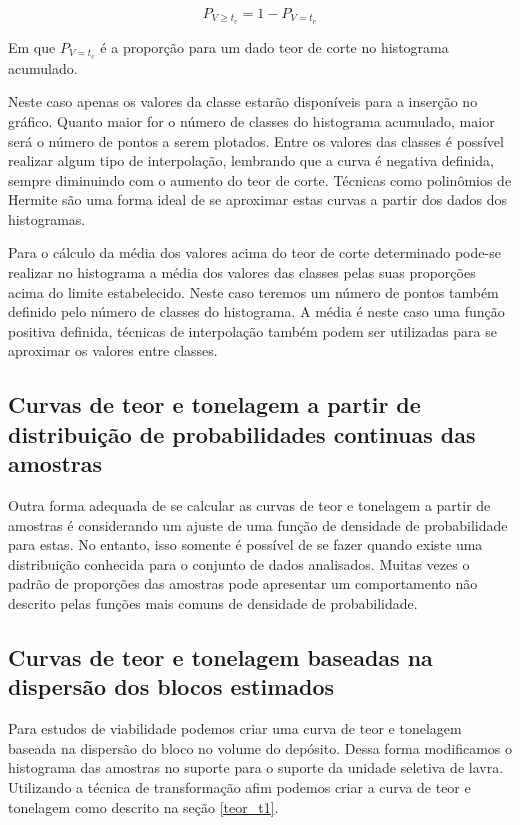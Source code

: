 \begin{equation}\label{propor_tc}
     P_{V\geq t_{c}} = 1-P_{V = t_{c}}
\end{equation}

Em que $P_{V = t_{c}}$ é a proporção para um dado teor de corte no histograma acumulado.  

Neste caso apenas os valores da classe estarão disponíveis para a inserção no gráfico. Quanto maior for o número de classes do histograma acumulado, maior será o número de pontos a serem plotados. Entre os valores das classes é possível realizar algum tipo de interpolação, lembrando que a curva é negativa definida, sempre diminuindo com o aumento do teor de corte. Técnicas como polinômios de Hermite são uma forma ideal de se aproximar estas curvas a partir dos dados dos histogramas. 

Para o cálculo da média dos valores acima do teor de corte determinado pode-se realizar no histograma a média dos valores das classes pelas suas proporções acima do limite estabelecido. Neste caso teremos um número de pontos também definido pelo número de classes  do histograma. A média é neste caso uma função positiva definida, técnicas de interpolação também podem ser utilizadas para se aproximar os valores entre classes. 

\subsection{Curvas de teor e tonelagem a partir de distribuição de probabilidades continuas das amostras}

Outra forma adequada de se calcular as curvas de teor e tonelagem a partir de amostras é considerando um ajuste de uma função de densidade de probabilidade para estas. No entanto, isso somente é possível de se fazer quando existe uma distribuição conhecida para o conjunto de dados analisados. Muitas vezes o padrão de proporções das amostras pode apresentar um comportamento não descrito pelas funções mais comuns de densidade de probabilidade.

\subsection{Curvas de teor e tonelagem baseadas na dispersão dos blocos estimados} \label{ref2}

Para estudos de viabilidade podemos criar uma curva de teor e tonelagem baseada na dispersão do bloco no volume do depósito. Dessa forma modificamos o histograma das amostras no suporte para o suporte da unidade seletiva de lavra. Utilizando a técnica de transformação afim podemos criar a curva de teor e tonelagem como descrito na seção \eqref{teor_t1}.

